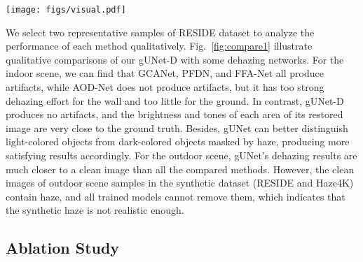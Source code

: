 \documentclass[10pt,twocolumn,letterpaper]{article}
\begin{document}
\begin{figure*}[t]
    \vspace{-0.4em}
    \centering
    \texttt{[image: figs/visual.pdf]}
    \caption{
        Qualitative comparison of image dehazing methods on SOTS, where the first two rows are indoor images, and the last two are outdoor images.
        The first column is the hazy images, and the last column is the corresponding ground truth.
    }
    \label{fig:compare1}
\end{figure*}

We select two representative samples of RESIDE dataset to analyze the performance of each method qualitatively.
Fig.~\ref{fig:compare1} illustrate qualitative comparisons of our gUNet-D with some dehazing networks. 
For the indoor scene, we can find that GCANet, PFDN, and FFA-Net all produce artifacts, while AOD-Net does not produce artifacts, but it has too strong dehazing effort for the wall and too little for the ground.
In contrast, gUNet-D produces no artifacts, and the brightness and tones of each area of its restored image are very close to the ground truth.
Besides, gUNet can better distinguish light-colored objects from dark-colored objects masked by haze, producing more satisfying results accordingly.
For the outdoor scene, gUNet's dehazing results are much closer to a clean image than all the compared methods.
However, the clean images of outdoor scene samples in the synthetic dataset (RESIDE and Haze4K) contain haze, and all trained models cannot remove them, which indicates that the synthetic haze is not realistic enough.

\subsection{Ablation Study}
\end{document}
